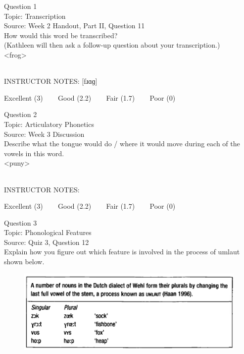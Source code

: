 \documentclass[12pt]{article}
\begin{document}
\begin{center}
\textbf{{\color{blue}{\HUGE START OF EXAM\\}}}

\textbf{{\color{blue}{\HUGE Student ID: 20054\\}}}

\textbf{{\color{blue}{\HUGE \\}}}

\end{center}
\newpage

{\large Question 1}\\

Topic: Transcription\\
Source: Week 2 Handout, Part II, Question 11\\

How would this word be transcribed?\\ (Kathleen will then ask a follow-up question about your transcription.)\\

<frog>


~\\
INSTRUCTOR NOTES: [fɹɑɡ]


\vfill
Excellent (3) ~~~ Good (2.2) ~~~ Fair (1.7) ~~~ Poor (0)
\newpage

{\large Question 2}\\

Topic: Articulatory Phonetics\\
Source: Week 3 Discussion\\

Describe what the tongue would do / where it would move during each of the vowels in this word.\\

<puny>


~\\
INSTRUCTOR NOTES: 


\vfill
Excellent (3) ~~~ Good (2.2) ~~~ Fair (1.7) ~~~ Poor (0)
\newpage

{\large Question 3}\\

Topic: Phonological Features\\
Source: Quiz 3, Question 12\\

Explain how you figure out which feature is involved in the process of umlaut shown below.\\

\begin{figure}[H]
\includegraphics{../images/dutch.png}
\end{figure}
\end{document}

